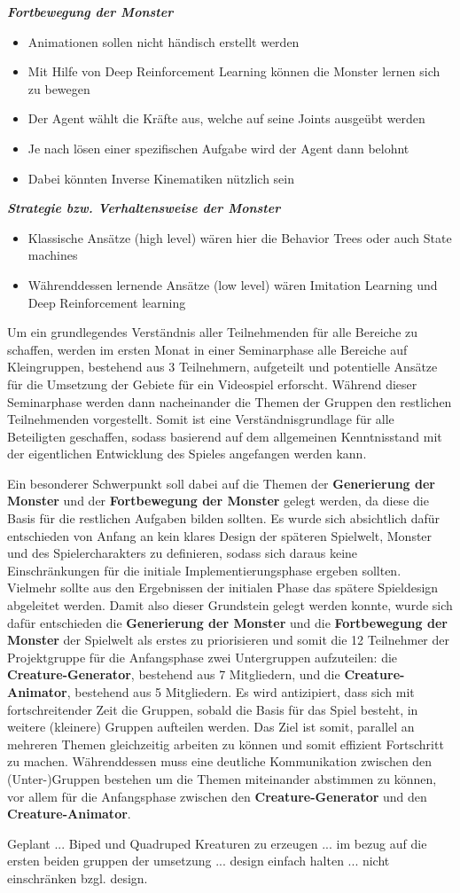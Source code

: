 \textbf{\textit{Fortbewegung der Monster}}
\begin{itemize}
	\item Animationen sollen nicht händisch erstellt werden
	\item Mit Hilfe von Deep Reinforcement Learning können die Monster lernen sich zu bewegen
	\item Der Agent wählt die Kräfte aus, welche auf seine Joints ausgeübt werden
	\item Je nach lösen einer spezifischen Aufgabe wird der Agent dann belohnt
	\item Dabei könnten Inverse Kinematiken nützlich sein
\end{itemize}
\textbf{\textit{Strategie bzw. Verhaltensweise der Monster}}
\begin{itemize}
	\item Klassische Ansätze (high level) wären hier die Behavior Trees oder auch State machines
	\item Währenddessen lernende Ansätze (low level) wären Imitation Learning und Deep Reinforcement learning
\end{itemize}

Um ein grundlegendes Verständnis aller Teilnehmenden für alle Bereiche zu schaffen, werden im ersten Monat in einer Seminarphase alle Bereiche auf Kleingruppen, bestehend aus 3 Teilnehmern, aufgeteilt und potentielle Ansätze für die Umsetzung der Gebiete für ein Videospiel erforscht. Während dieser Seminarphase werden dann nacheinander die Themen der Gruppen den restlichen Teilnehmenden vorgestellt. Somit ist eine Verständnisgrundlage für alle Beteiligten geschaffen, sodass basierend auf dem allgemeinen Kenntnisstand mit der eigentlichen Entwicklung des Spieles angefangen werden kann. 

Ein besonderer Schwerpunkt soll dabei auf die Themen der \textbf{Generierung der Monster} und der \textbf{Fortbewegung der Monster} gelegt werden, da diese die Basis für die restlichen Aufgaben bilden sollten. Es wurde sich absichtlich dafür entschieden von Anfang an kein klares Design der späteren Spielwelt, Monster und des Spielercharakters zu definieren, sodass sich daraus keine Einschränkungen für die initiale Implementierungsphase ergeben sollten. Vielmehr sollte aus den Ergebnissen der initialen Phase das spätere Spieldesign abgeleitet werden. Damit also dieser Grundstein gelegt werden konnte, wurde sich dafür entschieden die \textbf{Generierung der Monster} und die \textbf{Fortbewegung der Monster} der Spielwelt als erstes zu priorisieren und somit die 12 Teilnehmer der Projektgruppe für die Anfangsphase zwei Untergruppen aufzuteilen: die \textbf{Creature-Generator}, bestehend aus 7 Mitgliedern, und die \textbf{Creature-Animator}, bestehend aus 5 Mitgliedern. Es wird antizipiert, dass sich mit fortschreitender Zeit die Gruppen, sobald die Basis für das Spiel besteht, in weitere (kleinere) Gruppen aufteilen werden. Das Ziel ist somit, parallel an mehreren Themen gleichzeitig arbeiten zu können und somit effizient Fortschritt zu machen. Währenddessen muss eine deutliche Kommunikation zwischen den (Unter-)Gruppen bestehen um die Themen miteinander abstimmen zu können, vor allem für die Anfangsphase zwischen den \textbf{Creature-Generator} und den \textbf{Creature-Animator}.

Geplant ... Biped und Quadruped Kreaturen zu erzeugen ... im bezug auf die ersten beiden gruppen der umsetzung ... design einfach halten ... nicht einschränken bzgl. design.


